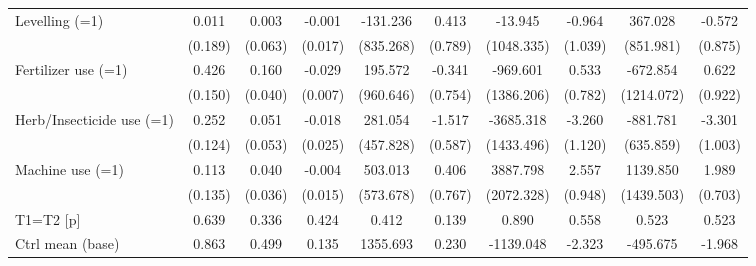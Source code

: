{\begin{tabular}{l*{9}{c}}
Levelling (=1)      &       0.011         &       0.003         &      -0.001         &    -131.236         &       0.413         &     -13.945         &      -0.964         &     367.028         &      -0.572         \\
                    &     (0.189)         &     (0.063)         &     (0.017)         &   (835.268)         &     (0.789)         &  (1048.335)         &     (1.039)         &   (851.981)         &     (0.875)         \\
Fertilizer use (=1) &       0.426\sym{**} &       0.160\sym{***}&      -0.029\sym{***}&     195.572         &      -0.341         &    -969.601         &       0.533         &    -672.854         &       0.622         \\
                    &     (0.150)         &     (0.040)         &     (0.007)         &   (960.646)         &     (0.754)         &  (1386.206)         &     (0.782)         &  (1214.072)         &     (0.922)         \\
Herb/Insecticide use (=1)&       0.252\sym{*}  &       0.051         &      -0.018         &     281.054         &      -1.517\sym{**} &   -3685.318\sym{**} &      -3.260\sym{**} &    -881.781         &      -3.301\sym{**} \\
                    &     (0.124)         &     (0.053)         &     (0.025)         &   (457.828)         &     (0.587)         &  (1433.496)         &     (1.120)         &   (635.859)         &     (1.003)         \\
Machine use (=1)    &       0.113         &       0.040         &      -0.004         &     503.013         &       0.406         &    3887.798         &       2.557\sym{**} &    1139.850         &       1.989\sym{**} \\
                    &     (0.135)         &     (0.036)         &     (0.015)         &   (573.678)         &     (0.767)         &  (2072.328)         &     (0.948)         &  (1439.503)         &     (0.703)         \\
\midrule
T1=T2 [p]           &       0.639         &       0.336         &       0.424         &       0.412         &       0.139         &       0.890         &       0.558         &       0.523         &       0.523         \\
Ctrl mean (base)    &       0.863         &       0.499         &       0.135         &    1355.693         &       0.230         &   -1139.048         &      -2.323         &    -495.675         &      -1.968         \\

\end{tabular}}
